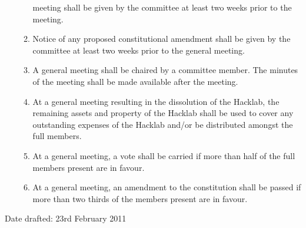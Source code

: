 \documentclass{article}
\begin{document}
\begin{enumerate}
\begin{enumerate}
        meeting shall be given by the committee at least two weeks
        prior to the meeting.
      \item Notice of any proposed constitutional amendment shall be
        given by the committee at least two weeks prior to the general
        meeting.
      \item A general meeting shall be chaired by a committee
        member. The minutes of the meeting shall be made available
        after the meeting.
      \item At a general meeting resulting in the dissolution of the
        Hacklab, the remaining assets and property of the Hacklab
        shall be used to cover any outstanding expenses of the Hacklab
        and/or be distributed amongst the full members.
      \item At a general meeting, a vote shall be carried if more than
        half of the full members present are in favour.
      \item At a general meeting, an amendment to the constitution
        shall be passed if more than two thirds of the members present
        are in favour.
      \end{enumerate}
      
\end{enumerate}
\bigskip
\begin{changebar}
Date drafted: 23rd February 2011
\end{changebar}
\end{document}
